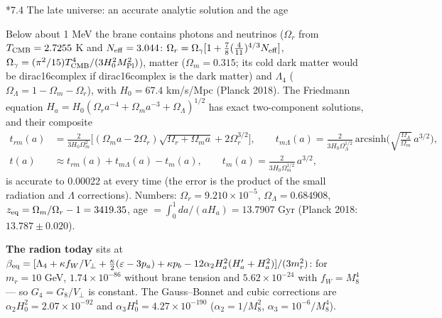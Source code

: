 \documentclass[10pt,a4paper]{article}
\makeatletter
\renewcommand\subsection{\@startsection{subsection}{2}{\z@}{-3.25ex\@plus -1ex \@minus -.2ex}{1.5ex \@plus .2ex}{\normalfont\large\bfseries\raggedright}}
\makeatother
\begin{document}
\subsection*{7.4 The late universe: an accurate analytic solution and the age}
Below about 1 MeV the brane contains photons and neutrinos ($\Omega_r$ from $T_{\rm CMB}=2.7255$ K and $N_{\rm eff}=3.044$: $\Omega_r=\Omega_\gamma[1+\tfrac78(\tfrac4{11})^{4/3}N_{\rm eff}]$, $\Omega_\gamma=(\pi^2/15)T_{\rm CMB}^4/(3H_0^2M_{\rm Pl}^2)$), matter ($\Omega_m=0.315$; its cold dark matter would be dirac16complex if dirac16complex is the dark matter) and $\Lambda_4$ ($\Omega_\Lambda=1-\Omega_m-\Omega_r$), with $H_0=67.4$ km/s/Mpc (Planck 2018). The Friedmann equation $H_a=H_0(\Omega_ra^{-4}+\Omega_ma^{-3}+\Omega_\Lambda)^{1/2}$ has exact two-component solutions, and their composite
\begin{align*}
t_{rm}(a)&=\frac{2}{3H_0\Omega_m^2}\Big[(\Omega_ma-2\Omega_r)\sqrt{\Omega_r+\Omega_ma}+2\Omega_r^{3/2}\Big],\qquad t_{m\Lambda}(a)=\frac{2}{3H_0\Omega_\Lambda^{1/2}}\,\mathrm{arcsinh}\Big(\sqrt{\tfrac{\Omega_\Lambda}{\Omega_m}}\,a^{3/2}\Big), \\
t(a)&\approx t_{rm}(a)+t_{m\Lambda}(a)-t_m(a),\qquad t_m(a)=\frac{2}{3H_0\Omega_m^{1/2}}\,a^{3/2},
\end{align*}
is accurate to 0.00022 at every time (the error is the product of the small radiation and $\Lambda$ corrections). Numbers: $\Omega_r=9.210\times10^{-5}$, $\Omega_\Lambda=0.684908$, $z_{\rm eq}=\Omega_m/\Omega_r-1=3419.35$, age $=\int_0^1da/(aH_a)=13.7907$ Gyr (Planck 2018: $13.787\pm0.020$).

\textbf{The radion today} sits at $\beta_{\rm eq}=[\Lambda_4+\kappa f_W/V_\perp+\tfrac\kappa2(\varepsilon-3p_a)+\kappa p_b-12\alpha_2H_a^2(H_a'+H_a^2)]/(3m_r^2)$: for $m_r=10$ GeV, $1.74\times10^{-86}$ without brane tension and $5.62\times10^{-24}$ with $f_W=M_8^4$ — so $G_4=G_8/V_\perp$ is constant. The Gauss–Bonnet and cubic corrections are $\alpha_2H_0^2=2.07\times10^{-92}$ and $\alpha_3H_0^4=4.27\times10^{-190}$ ($\alpha_2=1/M_8^2$, $\alpha_3=10^{-6}/M_8^4$).
\end{document}
